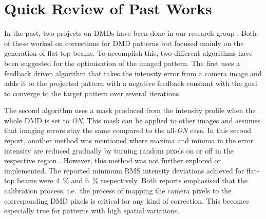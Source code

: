 \section[Past Works]{Quick Review of Past Works}
In the past, two projects on DMDs have been done in our research group \cite{krstajic,bartlett}. Both of these worked on corrections for DMD patterns but focused mainly on the generation of flat top beams. To accomplish this, two different algorithms have been suggested for the optimisation of the imaged pattern. The first uses a feedback driven algorithm that takes the intensity error from a camera image and adds it to the projected pattern with a negative feedback constant with the goal to converge to the target pattern over several iterations.%

The second algorithm uses a mask produced from the intensity profile when the whole DMD is set to \emph{ON}. This mask can be applied to other images and assumes that imaging errors stay the same compared to the all-\emph{ON} case. In this second report, another method was mentioned where maxima and minima in the error intensity are reduced gradually by turning random pixels on or off in the respective region \cite{liang:2010}. However, this method was not further explored or implemented. 
The reported minimum RMS intensity deviations achieved for flat-top beams were \SI{4}{\percent} \cite{krstajic} and \SI{6}{\percent} \cite{bartlett} respectively.
Both reports emphasised that the calibration process, i.e.\ the process of mapping the camera pixels to the corresponding DMD pixels is critical for any kind of correction. This becomes especially true for patterns with high spatial variations.

